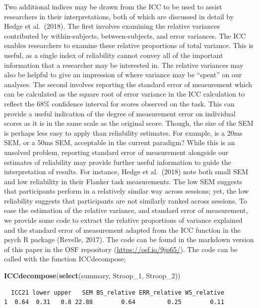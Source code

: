 \documentclass[english,,man,floatsintext]{apa6}
\newenvironment{Shaded}{\begin{snugshade}}{\end{snugshade}}
\newcommand{\DecValTok}[1]{\textcolor[rgb]{0.00,0.00,0.81}{#1}}
\newcommand{\KeywordTok}[1]{\textcolor[rgb]{0.13,0.29,0.53}{\textbf{#1}}}
\newcommand{\NormalTok}[1]{#1}
\begin{document}
Two additional indices may be drawn from the ICC to be used to assist researchers in their interpretations, both of which are discussed in detail by Hedge et al.~(2018). The first involves examining the relative variances contributed by within-subjects, between-subjects, and error variances. The ICC enables researchers to examine these relative proportions of total variance. This is useful, as a single index of reliability cannot convey all of the important information that a researcher may be interested in. The relative variances may also be helpful to give an impression of where variance may be \enquote{spent} on our analyses. The second involves reporting the standard error of measurement which can be calculated as the square root of error variance in the ICC calculation to reflect the 68\% confidence interval for scores observed on the task. This can provide a useful indication of the degree of measurement error on individual scores as it is in the same scale as the original score. Though, the size of the SEM is perhaps less easy to apply than reliability estimates. For example, is a 20ms SEM, or a 50ms SEM, acceptable in the current paradigm? While this is an unsolved problem, reporting standard error of measurement alongside our estimates of reliability may provide further useful information to guide the interpretation of results. For instance, Hedge et al.~(2018) note both small SEM and low reliability in their Flanker task measurements. The low SEM suggests that participants perform in a relatively similar way across sessions; yet, the low reliability suggests that participants are not similarly ranked across sessions. To ease the estimation of the relative variance, and standard error of measurement, we provide some code to extract the relative proportions of variance explained and the standard error of measurement adapted from the ICC function in the psych R package (Revelle, 2017). The code can be found in the markdown version of this paper in the OSF repository (\url{https://osf.io/9jp65/}). The code can be called with the function ICCdecompose;

\begin{Shaded}
\begin{Highlighting}[]
\KeywordTok{ICCdecompose}\NormalTok{(}\KeywordTok{select}\NormalTok{(summary, Stroop_}\DecValTok{1}\NormalTok{, Stroop_}\DecValTok{2}\NormalTok{))}
\end{Highlighting}
\end{Shaded}

\begin{verbatim}
  ICC21 lower upper   SEM BS_relative ERR_relative WS_relative
1  0.64  0.31   0.8 22.88        0.64         0.25        0.11
\end{verbatim}
\end{document}
